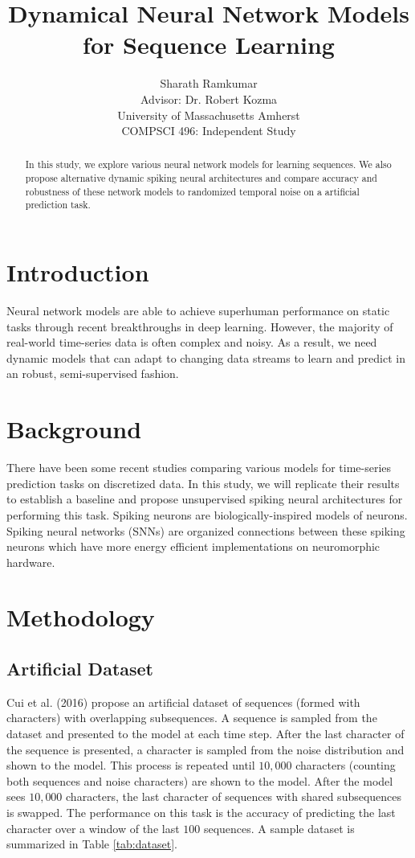 \documentclass{article}
\title{Dynamical Neural Network Models\\for Sequence Learning}
\author{Sharath Ramkumar\\
Advisor: Dr. Robert Kozma\\University of Massachusetts Amherst\\COMPSCI 496: Independent Study}
\date{}
\begin{document}
\maketitle

\begin{abstract}
In this study, we explore various neural network models for learning sequences. We also propose alternative dynamic spiking neural architectures and compare accuracy and robustness of these network models to randomized temporal noise on a artificial prediction task.
\end{abstract}

\section*{Introduction}

Neural network models are able to achieve superhuman performance on static tasks through recent breakthroughs in deep learning. However, the majority of real-world time-series data is often complex and noisy. As a result, we need dynamic models that can adapt to changing data streams to learn and predict in an robust, semi-supervised fashion. 

\section*{Background}
There have been some recent studies comparing various models for time-series prediction tasks \cite{cui2016continuous} on discretized data. In this study, we will replicate their results to establish a baseline and propose unsupervised spiking neural architectures for performing this task. Spiking neurons \cite{gerstner2002spiking} are biologically-inspired models of neurons. Spiking neural networks (SNNs) \cite{maass1997networks} are organized connections between these spiking neurons which have more energy efficient \cite{cruz2012energy} implementations on neuromorphic hardware.

\section*{Methodology}

\subsection*{Artificial Dataset}

Cui et al. (2016) propose an artificial dataset of sequences (formed with characters) with overlapping subsequences. A sequence is sampled from the dataset and presented to the model at each time step. After the last character of the sequence is presented, a character is sampled from the noise distribution and shown to the model. This process is repeated until $10,000$ characters (counting both sequences and noise characters) are shown to the model. After the model sees $10,000$ characters, the last character of sequences with shared subsequences is swapped. The performance on this task is the accuracy of predicting the last character over a window of the last $100$ sequences. A sample dataset is summarized in Table \ref{tab:dataset}.
\end{document}
